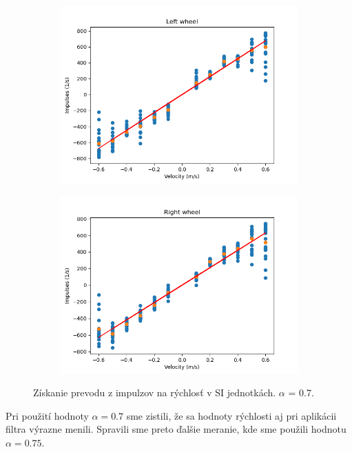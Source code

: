 \begin{figure}[!htbp]
	\begin{subfigure}{0.5\textwidth}
		\includegraphics[width=\textwidth]{img/lw_07250.png}
	\end{subfigure}
	\hfill
	\begin{subfigure}{0.5\textwidth}
		\includegraphics[width=\textwidth]{img/rw_07250.png}
	\end{subfigure}
	\caption{Získanie prevodu z impulzov na rýchlosť v SI jednotkách. \(\alpha\) = 0.7.}
	\label{fig:rw_lw_07250}
\end{figure}

\newpage

Pri použití hodnoty \(\alpha = 0.7\) sme zistili, že sa hodnoty rýchlosti aj pri aplikácii filtra výrazne menili.
Spravili sme preto ďalšie meranie, kde sme použili hodnotu \(\alpha = 0.75\).

